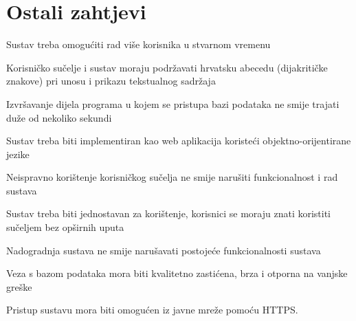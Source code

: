 	\section{Ostali zahtjevi}
	

	 
	 \begin{packed_item}
	 	\item Sustav treba omogućiti rad više korisnika u stvarnom vremenu 
	 	\item  Korisničko sučelje i sustav moraju podržavati hrvatsku abecedu (dijakritičke znakove) pri unosu i prikazu tekstualnog sadržaja
	 	\item  Izvršavanje dijela programa u kojem se pristupa bazi podataka ne smije trajati duže od nekoliko sekundi
	 	\item  Sustav treba biti implementiran kao web aplikacija koristeći objektno-orijentirane jezike
	 	\item  Neispravno korištenje korisničkog sučelja ne smije narušiti funkcionalnost i rad sustava
	 	\item  Sustav treba biti jednostavan za korištenje, korisnici se moraju znati koristiti sučeljem bez opširnih uputa
	 	\item  Nadogradnja sustava ne smije narušavati postojeće funkcionalnosti sustava
	 	\item  Veza s bazom podataka mora biti kvalitetno zastićena, brza i otporna na vanjske greške
	 	\item  Pristup sustavu mora biti omogućen iz javne mreže pomoću HTTPS. 
	 \end{packed_item}
	 
